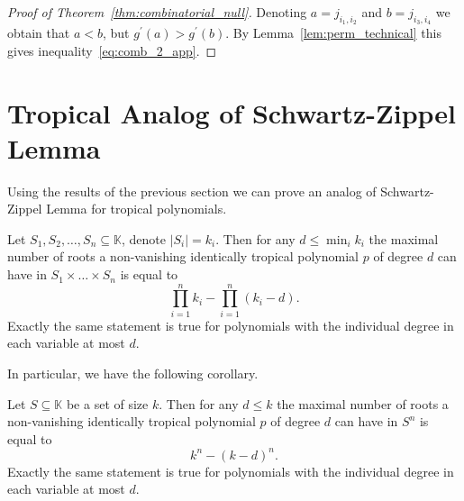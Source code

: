\documentclass[11pt]{article}
\newcommand{\bb}[1]{\mathbb{#1}}
\begin{document}
\begin{proof}[Proof of Theorem~\ref{thm:combinatorial_null}]
Denoting $a = j_{i_1,i_2}$ and $b = j_{i_3,i_4}$ we obtain that $a < b$, but $g^\prime(a) > g^\prime(b)$. By Lemma~\ref{lem:perm_technical} this gives inequality~\eqref{eq:comb_2_app}.
\end{proof}

\section{Tropical Analog of Schwartz-Zippel Lemma} \label{sec:schwartz_zippel}

Using the results of the previous section we can prove an analog of Schwartz-Zippel Lemma for tropical polynomials.

\begin{theorem} \label{thm:schwartz-zippel}
Let $S_1, S_2, \ldots, S_n \subseteq \bb{K}$, denote $|S_i|=k_i$.
Then for any $d \leq \min_i k_i$ the maximal number of roots a non-vanishing identically tropical polynomial $p$ of degree $d$ can have in $S_1\times \ldots \times S_n$ is equal to
$$
\prod_{i=1}^{n} k_i - \prod_{i=1}^n \left(k_i-d\right).
$$
Exactly the same statement is true for polynomials with the individual degree in each variable at most $d$.
\end{theorem}

In particular, we have the following corollary.
\begin{corollary}
Let $S \subseteq \bb{K}$ be a set of size $k$.
Then for any $d \leq k$ the maximal number of roots a non-vanishing identically tropical polynomial $p$ of degree $d$ can have in $S^n$ is equal to
$$
k^n - (k-d)^n.
$$
Exactly the same statement is true for polynomials with the individual degree in each variable at most $d$.
\end{corollary}
\end{document}
